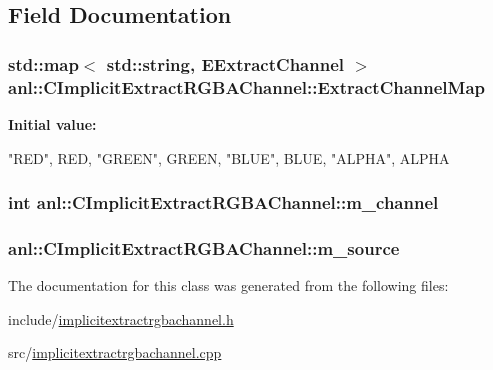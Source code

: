 \subsection{Field Documentation}
\hypertarget{classanl_1_1CImplicitExtractRGBAChannel_aa15d049fb69a69921db6c0540e2bebee}{
\subsubsection[{ExtractChannelMap}]{\setlength{\rightskip}{0pt plus 5cm}std::map$<$ std::string, {\bf EExtractChannel} $>$ {\bf anl::CImplicitExtractRGBAChannel::ExtractChannelMap}}}
\label{classanl_1_1CImplicitExtractRGBAChannel_aa15d049fb69a69921db6c0540e2bebee}
{\bfseries Initial value:}
\begin{DoxyCode}
 {
        {"RED", RED},
        {"GREEN", GREEN},
        {"BLUE", BLUE},
        {"ALPHA", ALPHA}
    }
\end{DoxyCode}
\hypertarget{classanl_1_1CImplicitExtractRGBAChannel_aeb2ec2a72305ce11711e168cc4465b06}{
\subsubsection[{m\_\-channel}]{\setlength{\rightskip}{0pt plus 5cm}int {\bf anl::CImplicitExtractRGBAChannel::m\_\-channel}}}
\label{classanl_1_1CImplicitExtractRGBAChannel_aeb2ec2a72305ce11711e168cc4465b06}
\hypertarget{classanl_1_1CImplicitExtractRGBAChannel_abcc55d49cef6ddbc40ab0ee3fbcff896}{
\subsubsection[{m\_\-source}]{ {\bf anl::CImplicitExtractRGBAChannel::m\_\-source}}}
\label{classanl_1_1CImplicitExtractRGBAChannel_abcc55d49cef6ddbc40ab0ee3fbcff896}


The documentation for this class was generated from the following files:\begin{DoxyCompactItemize}
\item 
include/\hyperlink{implicitextractrgbachannel_8h}{implicitextractrgbachannel.h}\item 
src/\hyperlink{implicitextractrgbachannel_8cpp}{implicitextractrgbachannel.cpp}\end{DoxyCompactItemize}
